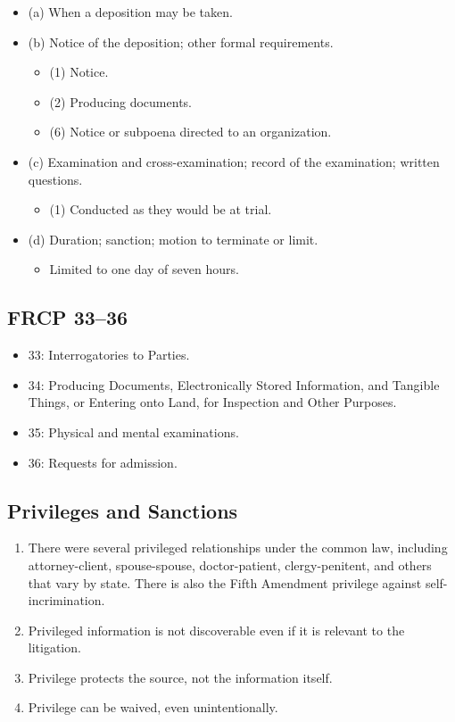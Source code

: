 \begin{itemize}
    \item (a) When a deposition may be taken.
    \item (b) Notice of the deposition; other formal requirements.
    \begin{itemize}
        \item (1) Notice.
        \item (2) Producing documents.
        \item (6) Notice or subpoena directed to an organization.
    \end{itemize}
    \item (c) Examination and cross-examination; record of the examination; written questions.
    \begin{itemize}
        \item (1) Conducted as they would be at trial.
    \end{itemize}
    \item (d) Duration; sanction; motion to terminate or limit.
    \begin{itemize}
        \item Limited to one day of seven hours.
    \end{itemize}
\end{itemize}

\subsection{FRCP 33--36}

\begin{itemize}
    \item 33: Interrogatories to Parties.
    \item 34: Producing Documents, Electronically Stored Information, and Tangible Things, or Entering onto Land, for Inspection and Other Purposes.
    \item 35: Physical and mental examinations.
    \item 36: Requests for admission.
\end{itemize}

\subsection{Privileges and Sanctions}

\begin{enumerate}
    \item There were several privileged relationships under the common law, including attorney-client, spouse-spouse, doctor-patient, clergy-penitent, and others that vary by state. There is also the Fifth Amendment privilege against self-incrimination.
    \item Privileged information is not discoverable even if it is relevant to the litigation.
    \item Privilege protects the source, not the information itself.
    \item Privilege can be waived, even unintentionally.
\end{enumerate}

